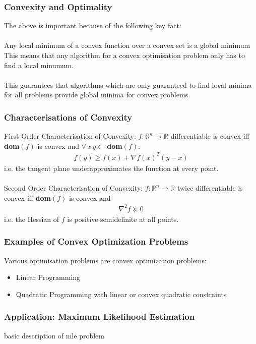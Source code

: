 \documentclass{beamer}
\def\rnum{\mathbb{R}}
\begin{document}
\begin{frame}
    \frametitle{Convexity and Optimality}
    The above is important because of the following key fact:
    \\~\\
    Any local minimum of a convex function over a convex set is a global
    minimum
    This means that any algorithm for a convex optimisation problem only has to
    find a local minumum.
    \\~\\
    This guarantees that algorithms which are only
    guaranteed to find local minima for all problems provide global minima for
    convex problems.
\end{frame}

\begin{frame}
    \frametitle{Characterisations of Convexity}
    First Order Characterisation of Convexity: $f : \rnum^{n} \rightarrow \rnum$
    differentiable is convex iff \textbf{dom}$(f)$ is convex and $\forall \, x
    \, y \in$ \textbf{dom}$(f)$:
    \begin{align*}
        f(y) \geq f(x) + \nabla f(x)^{T}(y-x)
    \end{align*}
    i.e. the tangent plane underapproximates the function at every point.
    \\~\\
    Second Order Characterisation of Convexity: $f : \rnum^{n} \rightarrow
    \rnum$ twice differentiable is convex iff \textbf{dom}$(f)$ is convex and
    \begin{align*}
        \nabla^{2}f \succeq 0
    \end{align*}
    i.e. the Hessian of $f$ is positive semidefinite at all points.
\end{frame}

\begin{frame}
    \frametitle{Examples of Convex Optimization Problems}
    Various optimisation problems are convex optimization problems:
    \begin{itemize}
        \item Linear Programming
        \item Quadratic Programming with linear or convex quadratic constraints
    \end{itemize}
\end{frame}

\begin{frame}
    \frametitle{Application: Maximum Likelihood Estimation}
    basic description of mle problem
\end{frame}
\end{document}
